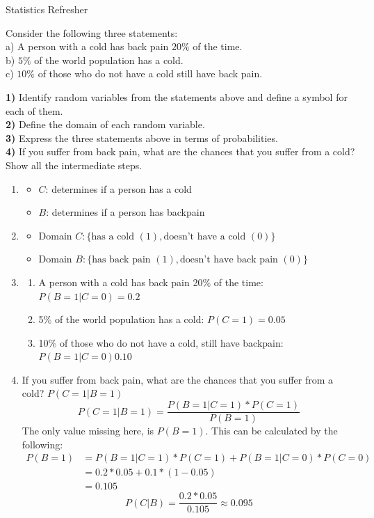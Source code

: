 \documentclass[
	english,
        solution=true
	]{tudaexercise}
\begin{document}
\begin{task}[points=15]{Statistics Refresher}

\begin{subtask}[points=7, title=Conditional Probability]
Consider the following three statements:
\\
a) A person with a cold has back pain $20\%$ of the time. 
\\
b) $5\%$ of the world population has a cold.
 \\
c) $10\%$ of those who do not have a cold still have back pain.

\textbf{1)} Identify random variables from the statements above and define a symbol for each of them.\\
\textbf{2)} Define the domain of each random variable.\\
\textbf{3)} Express the three statements above in terms of probabilities.\\
\textbf{4)} If you suffer from back pain, what are the chances that you suffer from a cold? Show all the intermediate steps.

\begin{solution}

\begin{enumerate}
    \item \begin{itemize}
        \item $C$: determines if a person has a cold
        \item $B$: determines if a person has backpain
    \end{itemize}
    \item \begin{itemize}
        \item Domain $C: \{\text{has a cold } (1), \text{doesn't have a cold }(0)\}$ 
        \item Domain $B: \{\text{has back pain }(1), \text{doesn't have back pain }(0)\}$ 
    \end{itemize}
    \item \begin{enumerate}
        \item A person with a cold has back pain 20\% of the time: $P(B=1|C=0)=0.2$
        \item 5\% of the world population has a cold: $P(C=1)=0.05$
        \item 10\% of those who do not have a cold, still have backpain: $P(B=1|C=0) 0.10$
    \end{enumerate}
    \item If you suffer from back  pain, what are the chances that you suffer from a cold? $P(C=1|B=1)$
    \[P(C=1|B=1)=\frac{P(B=1|C=1)*P(C=1)}{P(B=1)}\]
    The only value missing here, is $P(B=1)$. This can be calculated by the following:
    \begin{align*}
        P(B=1)&=P(B=1|C=1)*P(C=1)+P(B=1|C=0)*P(C=0) \\
        &= 0.2*0.05+0.1*(1-0.05)\\
        &= 0.105
    \end{align*}
    \[P(C|B)=\frac{0.2*0.05}{0.105}\approx0.095\]
\end{enumerate}


\end{solution}
\end{subtask}
\end{task}
\end{document}
